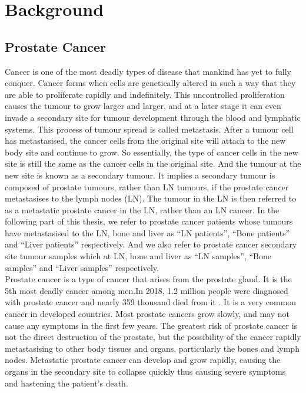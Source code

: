\documentclass[12pt,a4paper]{report}
\begin{document}
\chapter{Background}


\section{Prostate Cancer}
Cancer is one of the most deadly types of disease that mankind has yet to fully conquer. Cancer forms when cells are genetically altered in such a way that they are able to proliferate rapidly and indefinitely. This uncontrolled proliferation causes the tumour to grow larger and larger, and at a later stage it can even invade a secondary site for tumour development through the blood and lymphatic systems. This process of tumour spread is called metastasis. After a tumour cell has metastasised, the cancer cells from the original site will attach to the new body site and continue to grow. So essentially, the type of cancer cells in the new site is still the same as the cancer cells in the original site. And the tumour at the new site is known as a secondary tumour. It implies a secondary tumour is composed of prostate tumours, rather than LN tumours, if the prostate cancer metastasises to the lymph nodes (LN). The tumour in the LN is then referred to as a metastatic prostate cancer in the LN, rather than an LN cancer. In the following part of this thesis, we refer to prostate cancer patients whose tumours have metastasised to the LN, bone and liver as “LN patients”, “Bone patients” and “Liver patients” respectively. And we also refer to prostate cancer secondary site tumour samples which at LN, bone and liver as “LN samples”, “Bone samples” and “Liver samples” respectively.\\

Prostate cancer is a type of cancer that arises from the prostate gland. It is the 5th most deadly cancer among men\cite{WHO14}.In 2018, 1.2 million people were diagnosed with prostate cancer and nearly 359 thousand died from it \cite{Bra18} . It is a very common cancer in developed countries. Most prostate cancers grow slowly\cite{NCI14}, and may not cause any symptoms in the first few years. The greatest risk of prostate cancer is not the direct destruction of the prostate, but the possibility of the cancer rapidly metastasising to other body tissues and organs, particularly the bones and lymph nodes\cite{Rud15}. Metastatic prostate cancer can develop and grow rapidly, causing the organs in the secondary site to collapse quickly thus causing severe symptoms and hastening the patient's death.\\
\end{document}
